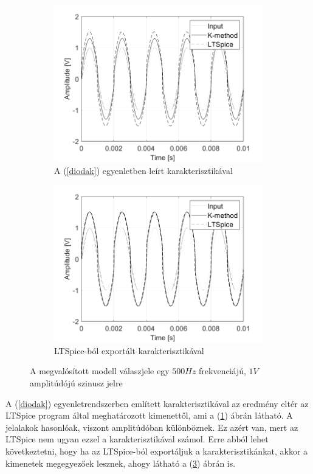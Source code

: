 \begin{figure}[!h]
    \centering
    \begin{subfigure}{0.47\textwidth}
        \centering
        \includegraphics[scale=0.38]{figures/ownmodel.png}
        \caption{A (\ref{diodak}) egyenletben leírt karakterisztikával}\label{a}
    \end{subfigure}
    \hfill
    \begin{subfigure}{0.47\textwidth}
        \centering
        \includegraphics[scale=0.38]{figures/spicemodel.png}
        \caption{LTSpice-ból exportált karakterisztikával}\label{b}
    \end{subfigure}
    \caption{A megvalósított modell válaszjele egy $500 Hz$ frekvenciájú, $1 V$ amplitúdójú szinusz 
    jelre}
\end{figure}
A (\ref{diodak}) egyenletrendszerben említett karakterisztikával az eredmény eltér az LTSpice program által 
meghatározott kimenettől, ami a (\ref{a}) ábrán látható. A jelalakok hasonlóak, viszont amplitúdóban különböznek. Ez 
azért van, mert az LTSpice nem ugyan ezzel a karakterisztikával számol. Erre abból lehet következtetni, hogy 
ha az LTSpice-ból exportáljuk a karakterisztikánkat, akkor a kimenetek megegyezőek lesznek, ahogy látható a (\ref{b}) ábrán is.